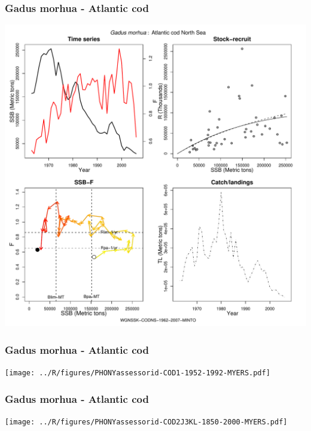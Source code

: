 \subsubsection{Gadus morhua - Atlantic cod}
\begin{center}
\includegraphics[width=1.2\textwidth]{../R/figures/WGNSSK-CODNS-1962-2007-MINTO.pdf}
\end{center}

\subsubsection{Gadus morhua - Atlantic cod}
\begin{center}
\texttt{[image: ../R/figures/PHONYassessorid-COD1-1952-1992-MYERS.pdf]}
\end{center}

\subsubsection{Gadus morhua - Atlantic cod}
\begin{center}
\texttt{[image: ../R/figures/PHONYassessorid-COD2J3KL-1850-2000-MYERS.pdf]}
\end{center}

